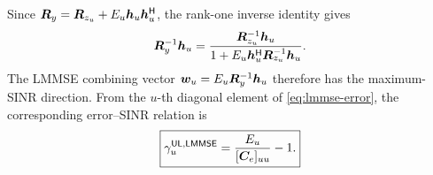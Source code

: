 Since $\bm{R}_y=\bm{R}_{z_u}+E_u\bm{h}_u{\bm{h}}^{\mathsf{H}}_u$, the rank-one inverse identity gives
\begin{equation}
	{\bm{R}}^{-1}_y\bm{h}_u
	=\frac{{\bm{R}}^{-1}_{z_u}\bm{h}_u}
	{1+E_u{\bm{h}}^{\mathsf{H}}_u{\bm{R}}^{-1}_{z_u}\bm{h}_u}.
\end{equation}
The LMMSE combining vector $\bm{w}_u=E_u{\bm{R}}^{-1}_y\bm{h}_u$ therefore has the maximum-SINR direction. From the $u$-th diagonal element of \eqref{eq:lmmse-error}, the corresponding error--SINR relation is
\begin{equation}
	\boxed{
		\gamma_u^{\mathsf{UL},\mathsf{LMMSE}}
		=\frac{E_u}{[\bm{C}_e]_{uu}}-1.
	}
\end{equation}




